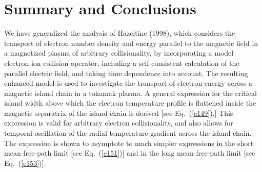 \documentclass[12pt,prb,aps]{revtex4-1}
\begin{document}
\section{Summary and Conclusions}
We have generalized the analysis of Hazeltine (1998), which considers the transport of electron number density and energy parallel to the magnetic
field in a magnetized plasma of arbitrary collisionality,  by  incorporating a model electron-ion collision operator,
 including a self-consistent calculation of the parallel electric field, and taking time dependence into account. The resulting enhanced model is
 used to investigate the transport of electron energy across a magnetic island chain in a tokamak plasma. A general expression for the critical
 island width above which the electron temperature profile is flattened inside the magnetic separatrix of the island chain is derived [see Eq.~(\ref{e149}).]
 This expression is valid for arbitrary electron collisionality, and also allows for temporal oscillation of the radial temperature gradient across the island chain. 
 The expression is shown to asymptote to much simpler expressions in the short mean-free-path limit [see Eq.~(\ref{e151})] and in the long mean-free-path limit [see
 Eq.~(\ref{e153})]. 
 
\end{document}
